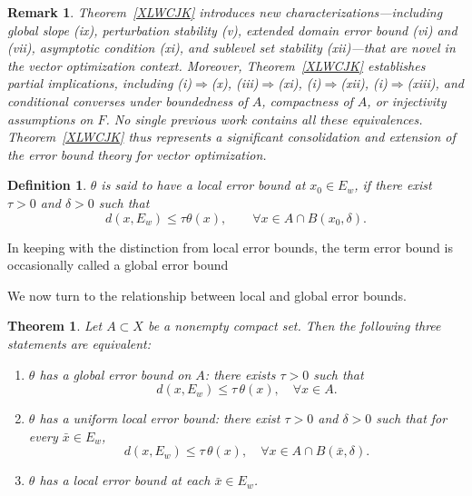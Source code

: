 \documentclass[11pt]{article}
\newtheorem{definition}{Definition}[section]
\newtheorem{theorem}{Theorem}[section]
\newtheorem{remark}{Remark}[section]
\begin{document}
\begin{remark}
 				
 	Theorem~\ref{XLWCJK} introduces new characterizations---including global slope (ix), perturbation stability (v), extended domain error bound (vi) and (vii), asymptotic   condition (xi), and sublevel set stability (xii)---that are novel in the vector optimization context. Moreover, Theorem~\ref{XLWCJK} establishes partial implications, including (i)\(\Rightarrow\)(x), (iii)\(\Rightarrow\)(xi), (i)\(\Rightarrow\)(xii), (i)\(\Rightarrow\)(xiii), and conditional converses under boundedness of $A$, compactness of $A$, or injectivity assumptions on \(F\). No single previous work contains all these equivalences. Theorem~\ref{XLWCJK} thus represents a significant consolidation and extension of the error bound theory for vector optimization.
   \end{remark}
 
 
 
 
 

\begin{definition}
	$\theta$ is said to have a  local error bound at $x_0 \in E_w$, if there exist $\tau > 0$  and $\delta > 0$ such that
	\[
	d(x, E_w) \leq \tau \theta (x), \qquad \forall x \in A \cap B(x_0,\delta).
	\]
	
\end{definition}
	In keeping with the distinction from local error bounds, the term error bound is occasionally called a global error bound
 
 
 
 
 We now turn to the relationship between local and global error bounds.
  

\begin{theorem} 
	\label{thm:localglobal}
	Let $A\subset X$ be a nonempty  compact  set. 
	Then the following three statements are equivalent:
	\begin{enumerate}
		\item[(i)]  $\theta$ has a global error bound  on $A$: there exists  $\tau>0$ such that
		\[
		d(x,E_w)\le \tau\,\theta(x),\quad \forall x\in A .
		\]
		\item[(ii)]  $\theta$ has a uniform local error bound: there exist  $\tau>0$ and $\delta>0$ such that for  every $\bar x\in E_w$,
	$$		d(x,E_w)\le \tau\,\theta(x),\quad \forall x\in A\cap B(\bar x,\delta).	$$
			\item[(iii)] $\theta$ has a local error bound at each $\bar x\in E_w$.
	\end{enumerate}
\end{theorem}
\end{document}
